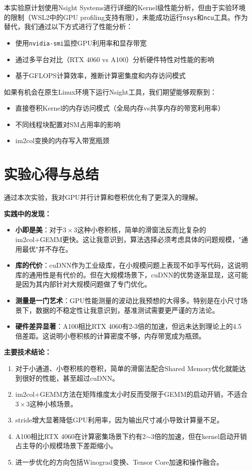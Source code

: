 \documentclass[a4paper]{article}
\begin{document}
本实验原计划使用Nsight Systems进行详细的Kernel级性能分析，但由于实验环境的限制（WSL2中的GPU profiling支持有限），未能成功运行\texttt{nsys}和\texttt{ncu}工具。作为替代，我们通过以下方式进行了性能分析：

\begin{itemize}
    \item 使用\texttt{nvidia-smi}监控GPU利用率和显存带宽
    \item 通过多平台对比（RTX 4060 vs A100）分析硬件特性对性能的影响
    \item 基于GFLOPS计算效率，推断计算密集度和内存访问模式
\end{itemize}

如果有机会在原生Linux环境下运行Nsight工具，我们期望能够观察到：
\begin{itemize}
    \item 直接卷积Kernel的内存访问模式（全局内存vs共享内存的带宽利用率）
    \item 不同线程块配置对SM占用率的影响
    \item im2col变换的内存写入带宽瓶颈
\end{itemize}

\section{实验心得与总结}

通过本次实验，我对GPU并行计算和卷积优化有了更深入的理解。

\textbf{实践中的发现：}
\begin{itemize}
    \item \textbf{小即是美}：对于$3\times 3$这种小卷积核，简单的滑窗法反而比复杂的im2col+GEMM更快。这让我意识到，算法选择必须考虑具体的问题规模，"通用最优"并不存在。
    \item \textbf{库的代价}：cuDNN作为工业级库，在小规模问题上表现不如手写代码，这说明库的通用性是有代价的。但在大规模场景下，cuDNN的优势逐渐显现，这可能是因为其内部针对大规模问题做了专门优化。
    \item \textbf{测量是一门艺术}：GPU性能测量的波动比我预想的大得多。特别是在小尺寸场景下，数据的不稳定性让我意识到，基准测试需要更严谨的方法论。
    \item \textbf{硬件差异显著}：A100相比RTX 4060有2-3倍的加速，但远未达到理论上的4.5倍差距。这说明小卷积核的计算密度不够，内存带宽成为瓶颈。
\end{itemize}

\textbf{主要技术结论：}
\begin{enumerate}
    \item 对于小通道、小卷积核的卷积，简单的滑窗法配合Shared Memory优化就能达到很好的性能，甚至超过cuDNN。
    \item im2col+GEMM方法在矩阵维度太小时反而受限于GEMM的启动开销，不适合$3\times 3$这种小核场景。
    \item stride增大显著降低GPU利用率，因为输出尺寸减小导致计算量不足。
    \item A100相比RTX 4060在计算密集场景下约有2$\sim$3倍的加速，但在kernel启动开销占主导的小规模场景下差距缩小。
    \item 进一步优化的方向包括Winograd变换、Tensor Core加速和操作融合。
\end{enumerate}
\end{document}
